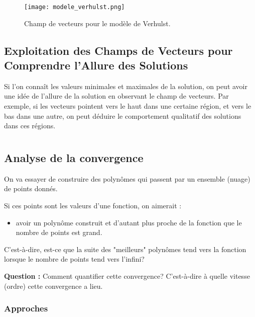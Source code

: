 \documentclass[oneside]{book}
\begin{document}
\begin{figure}[H]
    \centering
    \texttt{[image: modele\_verhulst.png]}
    \caption{Champ de vecteurs pour le modèle de Verhulst.}
    \label{fig:modele_verhulst}
\end{figure}


\section{Exploitation des Champs de Vecteurs pour Comprendre l'Allure des Solutions}

Si l'on connaît les valeurs minimales et maximales de la solution, on peut avoir une idée de l'allure de la solution en observant le champ de vecteurs. Par exemple, si les vecteurs pointent vers le haut dans une certaine région, et vers le bas dans une autre, on peut déduire le comportement qualitatif des solutions dans ces régions.\chapter{}
\sloppy

\section{Analyse de la convergence}

On va essayer de construire des polynômes qui passent par un ensemble (nuage) de points donnés.

Si ces points sont les valeurs d'une fonction, on aimerait :
\begin{itemize}
    \item avoir un polynôme construit et d'autant plus proche de la fonction que le nombre de points est grand.
\end{itemize}

C'est-à-dire, est-ce que la suite des "meilleurs" polynômes tend vers la fonction lorsque le nombre de points tend vers l'infini?

\textbf{Question :} Comment quantifier cette convergence? C'est-à-dire à quelle vitesse (ordre) cette convergence a lieu.

\subsection{Approches}
\end{document}
